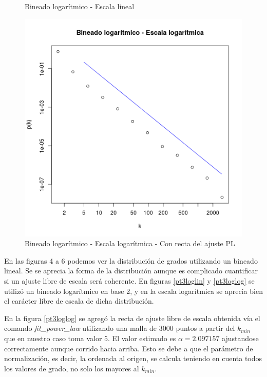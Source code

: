 \documentclass{article}
\begin{document}
\begin{figure}[!htb]
\begin{minipage}{0.3\textwidth}
	\caption{Bineado logarítmico - Escala lineal}
	\label{pt3loglin}
   \end{minipage}\hfill
      \begin{minipage}{0.3\textwidth}
	\centering
	\includegraphics[width=.7\linewidth]{Imagenes_P3/P3_binlog_log.png}
	\caption{Bineado logarítmico - Escala logarítmica - Con recta del ajuste PL}	
	\label{pt3loglog}
   \end{minipage}\hfill
   \label{pt2layout}
\end{figure}

En las figuras 4 a 6 podemos ver la distribución de grados utilizando un bineado lineal. Se se aprecia la forma de la distribución aunque es complicado cuantificar si un ajuste libre de escala será coherente. En figuras \ref{pt3loglin} y \ref{pt3loglog} se utilizó un bineado logarítmico en base 2, y en la escala logarítmica se aprecia bien el carácter libre de escala de dicha distribución.

En la figura \ref{pt3loglog} se agregó la recta de ajuste libre de escala obtenida vía el comando \textit{fit\_power\_law} utilizando una malla de $3000$ puntos a partir del $k_{min}$ que en nuestro caso toma valor $5$. El valor estimado es $\alpha=2.097157$ ajustandose correctamente aunque corrido hacia arriba. Esto se debe a que el parámetro de normalización, es decir, la ordenada al origen, se calcula teniendo en cuenta todos los valores de grado, no solo los mayores al $k_{min}$.





\end{document}
